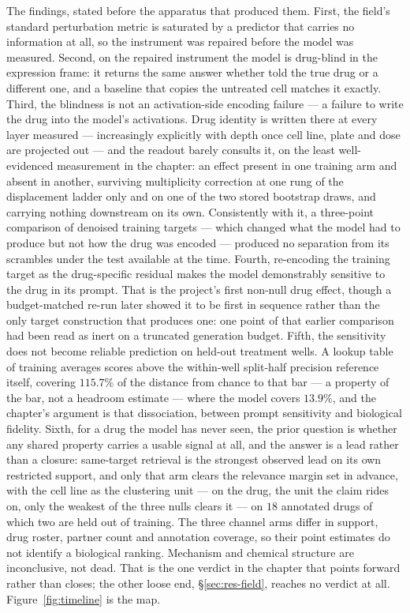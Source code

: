 The findings, stated before the apparatus that produced them. First, the field's standard
perturbation metric is saturated by a predictor that carries no information at all, so the
instrument was repaired before the model was measured. Second, on the repaired instrument the model
is drug-blind in the expression frame: it returns the same answer whether told the true drug or a
different one, and a baseline that copies the untreated cell matches it exactly. Third, the
blindness is not an activation-side encoding failure --- a failure to write the drug into the
model's activations. Drug identity is written there at
every layer measured --- increasingly explicitly with depth once cell line, plate and dose are
projected out --- and the readout barely consults it, on the least well-evidenced measurement in
the chapter: an effect present in one training arm and absent in another, surviving multiplicity
correction at one rung of the displacement ladder only and on one of the two stored bootstrap
draws, and carrying nothing downstream on its own.
Consistently with it, a
three-point comparison of denoised training targets --- which changed what the model had to produce but not how the
drug was encoded --- produced no separation from its scrambles under the test available at the time.
Fourth, re-encoding the training target as the drug-specific residual makes the model demonstrably
sensitive to the drug in its prompt. That is the project's first non-null drug effect, though a
budget-matched re-run later showed it to be first in sequence rather than the only target
construction that produces one: one point of that earlier comparison had been read as inert on a truncated
generation budget. Fifth, the sensitivity does not become reliable prediction on held-out treatment
wells. A lookup table of training averages scores above the within-well split-half precision
reference itself, covering $115.7\%$ of the distance from chance to that bar --- a property of the
bar, not a headroom estimate --- where the model covers $13.9\%$, and the chapter's argument is that
dissociation, between prompt sensitivity and biological fidelity. Sixth, for a drug the model has
never seen, the prior question is whether any shared property carries a usable signal at all, and
the answer is a lead rather than a closure: same-target retrieval is the strongest observed lead on
its own restricted support, and only that arm clears the relevance margin set in advance, with the
cell line as the clustering unit --- on the drug, the unit the claim rides on, only the weakest of
the three nulls clears it --- on $18$ annotated drugs of which two are held out of training. The
three channel arms differ in support, drug roster, partner count and annotation coverage, so their
point estimates do not identify a biological ranking.
Mechanism and chemical structure are inconclusive, not dead. That is the one verdict in the chapter
that points forward rather than closes; the other loose end, \S\ref{sec:res-field}, reaches no
verdict at all. Figure~\ref{fig:timeline} is the map.

